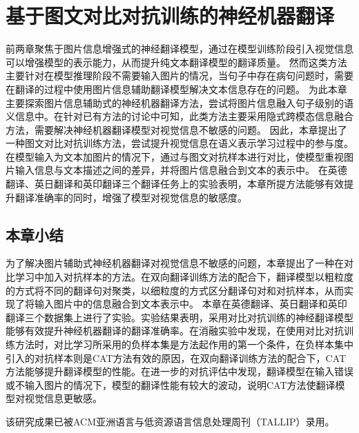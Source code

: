 \chapter{基于图文对比对抗训练的神经机器翻译}
前两章聚焦于图片信息增强式的神经翻译模型，通过在模型训练阶段引入视觉信息可以增强模型的表示能力，从而提升纯文本翻译模型的翻译质量。
然而这类方法主要针对在模型推理阶段不需要输入图片的情况，当句子中存在病句问题时，需要在翻译的过程中使用图片信息辅助翻译模型解决文本信息存在的问题。
为此本章主要探索图片信息辅助式的神经机器翻译方法，尝试将图片信息融入句子级别的语义信息中。在针对已有方法的讨论中可知，此类方法主要采用隐式跨模态信息融合方法，需要解决神经机器翻译模型对视觉信息不敏感的问题。
因此，本章提出了一种图文对比对抗训练方法，尝试提升视觉信息在语义表示学习过程中的参与度。在模型输入为文本加图片的情况下，通过与图文对抗样本进行对比，使模型重视图片输入信息与文本描述之间的差异，并将图片信息融合到文本的表示中。
在英德翻译、英日翻译和英印翻译三个翻译任务上的实验表明，本章所提方法能够有效提升翻译准确率的同时，增强了模型对视觉信息的敏感度。







\section{本章小结}
为了解决图片辅助式神经机器翻译对视觉信息不敏感的问题，本章提出了一种在对比学习中加入对抗样本的方法。在双向翻译训练方法的配合下，翻译模型以粗粒度的方式将不同的翻译句对聚类，以细粒度的方式区分翻译句对和对抗样本，从而实现了将输入图片中的信息融合到文本表示中。
本章在英德翻译、英日翻译和英印翻译三个数据集上进行了实验。实验结果表明，采用对比对抗训练的神经翻译模型能够有效提升神经机器翻译的翻译准确率。在消融实验中发现，在使用对比对抗训练方法时，对比学习所采用的负样本集是方法起作用的第一个条件，在负样本集中引入的对抗样本则是CAT方法有效的原因，在双向翻译训练方法的配合下，CAT方法能够提升翻译模型的性能。在进一步的对抗评估中发现，翻译模型在输入错误或不输入图片的情况下，模型的翻译性能有较大的波动，说明CAT方法使翻译模型对视觉信息更敏感。

该研究成果已被ACM亚洲语言与低资源语言信息处理周刊（TALLIP）录用。